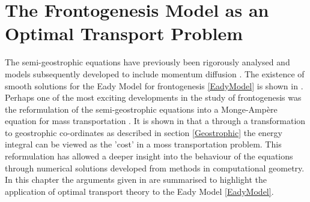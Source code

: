 \chapter{The Frontogenesis Model as an Optimal Transport Problem}
The semi-geostrophic equations have previously been rigorously analysed \cite{Hoskins1975,Bannon1988,Cullen1993} and models subsequently developed to include momentum diffusion \cite{Blumen1990, Nakamura1994}. The existence of smooth solutions for the Eady Model for frontogenesis \ref{EadyModel} is shown in \cite{Brenier2009}. Perhaps one of the most exciting developments in the study of frontogenesis was the reformulation of the semi-geostrophic equations into a Monge-Amp\`{e}re equation for mass transportation \cite{Benamou1998} . It is shown in \cite{Cullen2006a} that a through a transformation to geostrophic co-ordinates as described in section \ref{Geostrophic} the energy integral can be viewed as the 'cost' in a moss transportation problem. This reformulation has allowed a deeper insight into the behaviour of the equations through numerical solutions developed from methods in computational geometry. In this chapter the arguments given in \cite{Cullen2006a} are summarised to highlight the application of optimal transport theory to the Eady Model \ref{EadyModel}.
